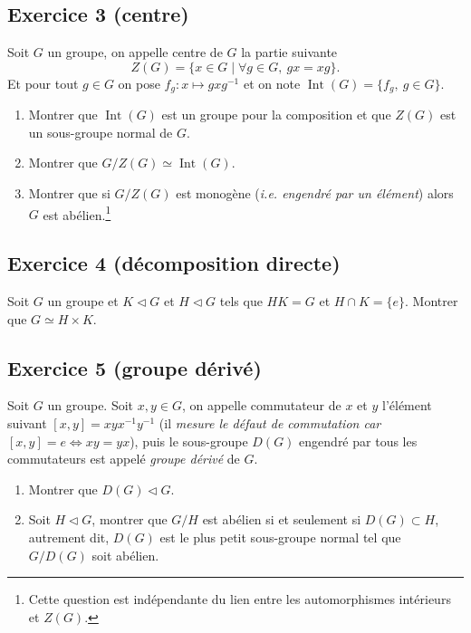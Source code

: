 \documentclass[11pt,a4paper]{article}
\newcommand{\normal}{\mathrel{\triangleleft}}
\begin{document}
\subsection*{Exercice 3 (centre)}
Soit $G$ un groupe, on appelle centre de $G$ la partie suivante
\[
  Z(G)=\{x\in G\mid \forall g\in G,\ gx=xg\}.
\]
Et pour tout $g\in G$ on pose $f_g:x\mapsto gxg^{-1}$ et on note $\operatorname{Int}(G)=\{f_g,\ g\in G\}$.
\begin{enumerate}
  \item Montrer que $\operatorname{Int}(G)$ est un groupe pour la composition et que $Z(G)$ est un sous-groupe normal de $G$.
  \item Montrer que $G/Z(G)\simeq \operatorname{Int}(G)$.
  \item Montrer que si $G/Z(G)$ est monogène (\emph{i.e. engendré par un élément}) alors $G$ est abélien.\footnote{Cette question est indépendante du lien entre les automorphismes intérieurs et $Z(G)$.}
\end{enumerate}

\subsection*{Exercice 4 (décomposition directe)}
Soit $G$ un groupe et $K\normal G$ et $H\normal G$ tels que $HK=G$ et $H\cap K=\{e\}$. Montrer que $G\simeq H\times K$.

\subsection*{Exercice 5 (groupe dérivé)}
Soit $G$ un groupe. Soit $x,y\in G$, on appelle commutateur de $x$ et $y$ l'élément suivant $[x,y]=xyx^{-1}y^{-1}$ (il \emph{mesure le défaut de commutation car $[x,y]=e\Longleftrightarrow xy=yx$}), puis le sous-groupe $D(G)$ engendré par tous les commutateurs est appelé \emph{groupe dérivé} de $G$.
\begin{enumerate}
  \item Montrer que $D(G)\normal G$.
  \item Soit $H\normal G$, montrer que $G/H$ est abélien si et seulement si $D(G)\subset H$, autrement dit, $D(G)$ est le plus petit sous-groupe normal tel que $G/D(G)$ soit abélien.
\end{enumerate}
\end{document}
